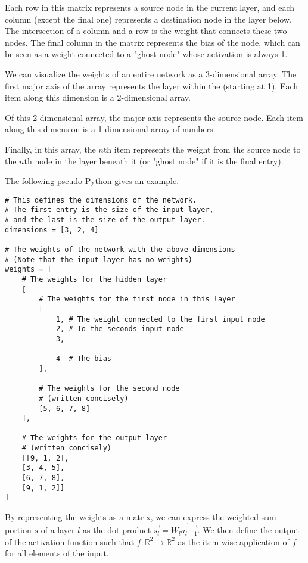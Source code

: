 \documentclass[8pt]{amsart}
\begin{document}
Each row in this matrix represents a source node in the current layer, and each
column (except the final one) represents a destination node in the layer below.
The intersection of a column and a row is the weight that connects these two nodes.
The final column in the matrix represents the bias of the node, which can be seen
as a weight connected to a "ghost node" whose activation is always 1.

We can visualize the weights of an entire network as a 3-dimensional array. The first
major axis of the array represents the layer within the  (starting at 1). Each item
along this dimension is a 2-dimensional array.

Of this 2-dimensional array, the major axis represents the source node. Each item
along this dimension is a 1-dimensional array of numbers.

Finally, in this array, the $n$th item represents the weight from the source node
to the $n$th node in the layer beneath it (or "ghost node" if it is the final entry).

The following pseudo-Python gives an example.

\begin{verbatim}
# This defines the dimensions of the network.
# The first entry is the size of the input layer,
# and the last is the size of the output layer.
dimensions = [3, 2, 4]

# The weights of the network with the above dimensions
# (Note that the input layer has no weights)
weights = [
    # The weights for the hidden layer
    [
        # The weights for the first node in this layer
        [
            1, # The weight connected to the first input node
            2, # To the seconds input node
            3,
            
            4  # The bias
        ],

        # The weights for the second node
        # (written concisely)
        [5, 6, 7, 8]
    ],

    # The weights for the output layer
    # (written concisely)
    [[9, 1, 2],
    [3, 4, 5],
    [6, 7, 8],
    [9, 1, 2]]
]
\end{verbatim}

By representing the weights as a matrix, we can express the weighted sum portion $s$
of a layer $l$ as the dot product $\vec{s_l} = W_l \dot \vec{a_{l - 1}}$. We then
define the output of the activation function such that
$f: \mathbb{R}^2 \to \mathbb{R}^2$ as the item-wise application of $f$ for
all elements of the input.
\end{document}

